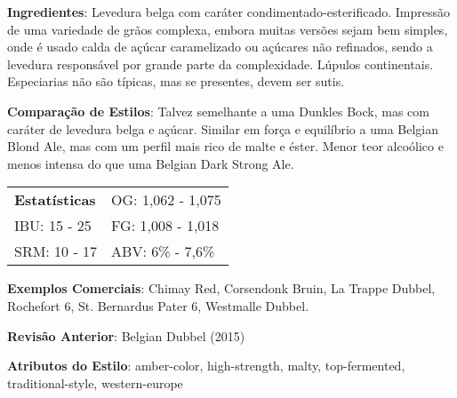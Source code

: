 \textbf{Ingredientes}: Levedura belga com caráter condimentado-esterificado. Impressão de uma variedade de grãos complexa, embora muitas versões sejam bem simples, onde é usado calda de açúcar caramelizado ou açúcares não refinados, sendo a levedura responsável por grande parte da complexidade. Lúpulos continentais. Especiarias não são típicas, mas se presentes, devem ser sutis.

\textbf{Comparação de Estilos}: Talvez semelhante a uma Dunkles Bock, mas com caráter de levedura belga e açúcar. Similar em força e equilíbrio a uma Belgian Blond Ale, mas com um perfil mais rico de malte e éster. Menor teor alcoólico e menos intensa do que uma Belgian Dark Strong Ale.

\begin{tabular}{@{}p{35mm}p{35mm}@{}}
  \textbf{Estatísticas} & OG: 1,062 - 1,075 \\
  IBU: 15 - 25  & FG: 1,008 - 1,018  \\
  SRM: 10 - 17  & ABV: 6\% - 7,6\%
\end{tabular}

\textbf{Exemplos Comerciais}: Chimay Red, Corsendonk Bruin, La Trappe Dubbel, Rochefort 6, St. Bernardus Pater 6, Westmalle Dubbel.

\textbf{Revisão Anterior}: Belgian Dubbel (2015)

\textbf{Atributos do Estilo}: amber-color, high-strength, malty, top-fermented, traditional-style, western-europe
